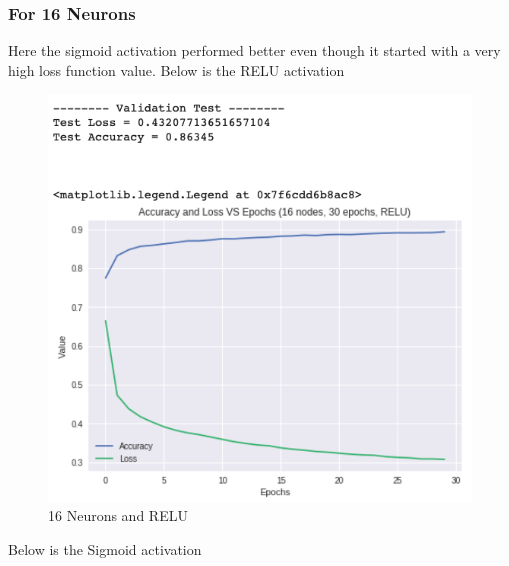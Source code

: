 \documentclass[a4paper, 12pt]{article}
\begin{document}
    \subsubsection{For 16 Neurons}

    Here the sigmoid activation performed better even though it started with a very high loss function value. Below is the RELU activation

    \begin{figure}[h!]
        \centering
        \captionsetup{justification=centering}
        \includegraphics[scale = 0.3]{16_RELU.png}
        \caption{16 Neurons and RELU}
    \end{figure}

    Below is the Sigmoid activation
    
\end{document}
